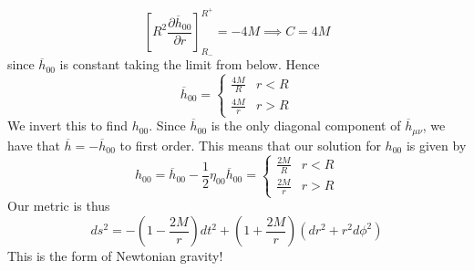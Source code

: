 \documentclass[11pt, a4paper]{article}   	%
\theoremstyle{slplain}
\begin{document}
\[
\left[  R ^ 2 \frac{\partial  \overline{ h } _{ 00 } }{\partial  r }   \right] ^{ R ^ + } _{ R _  -  }   =  - 4 M \implies C = 4 M  
\] since $ \overline{ h } _{ 00 } $ is constant taking the 
limit from below. 
Hence
\[
\overline{ h } _{ 00 }  = \begin{cases}
\frac{4M}{R } & r < R \\
\frac{4M}{r } & r > R 
\end{cases}
\] We invert this to find $ h_{ 00}  $. Since $ \overline{ h } _{ 00}  $ 
is the only diagonal component of $ \overline{ h } _{ \mu \nu } $, 
we have that $ \overline{ h }  =  - \overline{ h } _{ 00 } $ to first order. 
This means that our solution for $ h_{ 00 } $ is given by 
\[
h _{ 00 }  = \overline{ h } _{ 00 }  - \frac{1}{2 } \eta _{ 00 } \overline{ h } _{ 00 } = \begin{cases}
\frac{2M}{R  }  & r < R \\
\frac{2M}{ r } & r > R 
\end{cases} 
\] Our metric is thus 
\[
ds^ 2 =  - \left( 1  - \frac{2M}{ r }  \right) dt ^ 2  
+ \left( 1 + \frac{2M}{r }  \right)  \left( dr ^ 2 + r ^ 2 d \phi ^ 2  \right)  
\] This is the form of Newtonian gravity!
\end{document}
